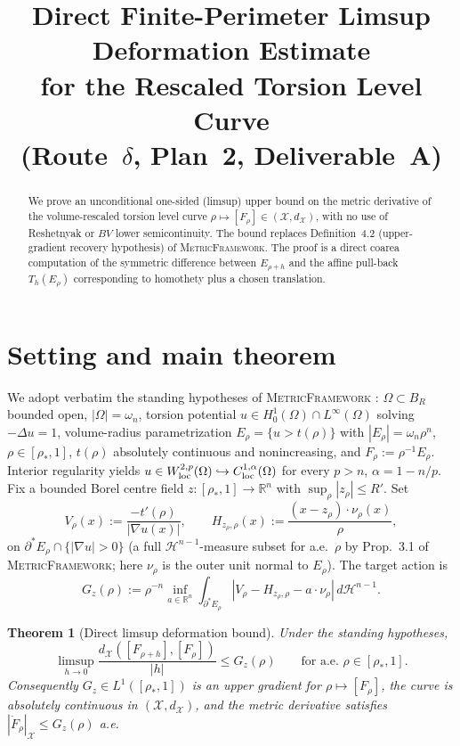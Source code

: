 \documentclass[11pt]{article}
\title{Direct Finite-Perimeter Limsup Deformation Estimate\\
       for the Rescaled Torsion Level Curve\\
       (Route~$\delta$, Plan~2, Deliverable~A)}
\author{}
\date{}
\newtheorem{theorem}{Theorem}[section]
\theoremstyle{definition}
\newcommand{\R}{\mathbb{R}}
\newcommand{\Om}{\Omega}
\newcommand{\rstar}{\rho_{*}}
\newcommand{\X}{\mathcal X}
\newcommand{\Hn}{\mathcal H^{n-1}}
\begin{document}
\maketitle

\begin{abstract}
We prove an unconditional one-sided (limsup) upper bound on the metric
derivative of the volume-rescaled torsion level curve
$\rho\mapsto[F_\rho]\in(\X,d_\X)$, with no use of Reshetnyak or $BV$ lower
semicontinuity.  The bound replaces Definition~4.2 (upper-gradient
recovery hypothesis) of \textsc{MetricFramework}.  The proof is a direct
coarea computation of the symmetric difference between $E_{\rho+h}$ and
the affine pull-back $T_h(E_\rho)$ corresponding to homothety plus a chosen
translation.
\end{abstract}

\section{Setting and main theorem}\label{sec:setup}

We adopt verbatim the standing hypotheses of \textsc{MetricFramework}
\cite{MetricFramework}: $\Om\subset B_R$ bounded open, $|\Om|=\omega_n$,
torsion potential $u\in H^1_0(\Om)\cap L^\infty(\Om)$ solving
$-\Delta u=1$, volume-radius parametrization $E_\rho=\{u>t(\rho)\}$ with
$|E_\rho|=\omega_n\rho^n$, $\rho\in[\rstar,1]$, $t(\rho)$ absolutely
continuous and nonincreasing, and $F_\rho:=\rho^{-1}E_\rho$. Interior
regularity yields $u\in W^{2,p}_{\rm loc}(\Om)\hookrightarrow
C^{1,\alpha}_{\rm loc}(\Om)$ for every $p>n$, $\alpha=1-n/p$. Fix a bounded
Borel centre field $z:[\rstar,1]\to\R^n$ with $\sup_\rho|z_\rho|\le R'$.
Set
\begin{equation}\label{eq:V-H}
   V_\rho(x):=\frac{-t'(\rho)}{|\nabla u(x)|},\qquad
   H_{z_\rho,\rho}(x):=\frac{(x-z_\rho)\cdot\nu_\rho(x)}{\rho},
\end{equation}
on $\partial^*E_\rho\cap\{|\nabla u|>0\}$ (a full $\Hn$-measure subset for
a.e.\ $\rho$ by Prop.~3.1 of \textsc{MetricFramework}; here $\nu_\rho$ is
the outer unit normal to $E_\rho$). The target action is
\begin{equation}\label{eq:G-def}
   G_z(\rho):=\rho^{-n}\inf_{a\in\R^n}
   \int_{\partial^*E_\rho}|V_\rho-H_{z_\rho,\rho}-a\cdot\nu_\rho|\,d\Hn .
\end{equation}

\begin{theorem}[Direct limsup deformation bound]\label{thm:main}
Under the standing hypotheses,
\begin{equation}\label{eq:limsup}
   \limsup_{h\to 0}\frac{d_\X([F_{\rho+h}],[F_\rho])}{|h|}
   \le G_z(\rho)
   \qquad\text{for a.e.\ }\rho\in[\rstar,1].
\end{equation}
Consequently $G_z\in L^1([\rstar,1])$ is an upper gradient for
$\rho\mapsto[F_\rho]$, the curve is absolutely continuous in $(\X,d_\X)$,
and the metric derivative satisfies $|\dot F_\rho|_\X\le G_z(\rho)$ a.e.
\end{theorem}
\end{document}
